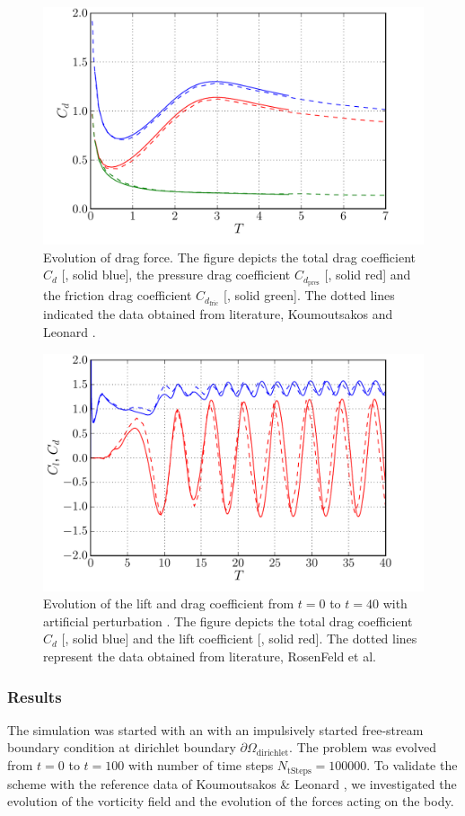 	\begin{figure}[p]
	\centering
	\includegraphics[width=0.7\linewidth]{./figures/eulerian/ISC_dragEvolution.pdf}
	\caption{Evolution of drag force. The figure depicts the total drag coefficient $C_d$ [{\color{plotBlue}{---}}, solid blue], the pressure drag coefficient $C_{d_{\mathrm{pres}}}$ [{\color{plotRed}{---}}, solid red] and the friction drag coefficient $C_{d_{\mathrm{fric}}}$ [{\color{plotGreen}{---}}, solid green]. The dotted lines indicated the data obtained from literature, Koumoutsakos and Leonard \cite{Koumoutsakos1995a}.}
	\label{fig:ISC_dragEvolution}
	\end{figure}
	
	\begin{figure}[p]
	\centering
	\includegraphics[width=0.7\linewidth]{./figures/eulerian/ISC_LongRun_dragLiftEvolution.pdf}
	\caption{Evolution of the lift and drag coefficient from $t=0$ to $t=40$ with artificial perturbation \cite{Lecointe1984}. The figure depicts the total drag coefficient $C_d$ [{\color{plotBlue}{---}}, solid blue] and the lift coefficient [{\color{plotRed}{---}}, solid red]. The dotted lines represent the data obtained from literature, RosenFeld et al. \cite{MosheRosenFeldDochanKwak1991}}
	\label{fig:ISC_LongRun_dragLiftEvolution}
	\end{figure}	

\subsubsection*{Results}
The simulation was started with an with an impulsively started free-stream boundary condition at dirichlet boundary $\partial \Omega_{\mathrm{dirichlet}}$. The problem was evolved from $t=0$ to $t=100$ with number of time steps $N_{\mathrm{tSteps}}=100000$. To validate the scheme with the reference data of Koumoutsakos \& Leonard \cite{Koumoutsakos1995a}, we investigated the evolution of the vorticity field and the evolution of the forces acting on the body.


